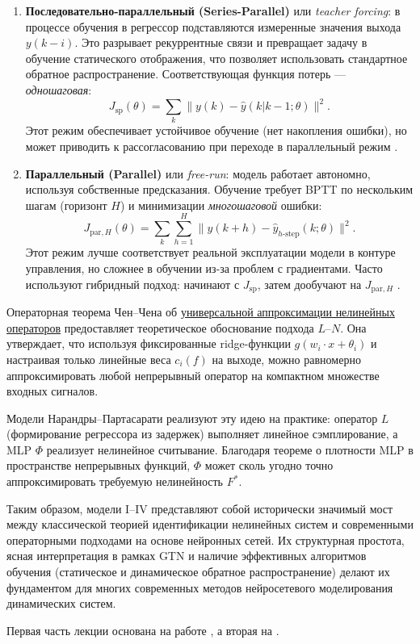 \documentclass[../NDCNNAI_main.tex]{subfiles}
\begin{document}
\begin{enumerate}
    \item \textbf{Последовательно-параллельный (Series-Parallel)} или \emph{teacher forcing}: в процессе обучения в регрессор подставляются измеренные значения выхода \(y(k-i)\). Это разрывает рекуррентные связи и превращает задачу в обучение статического отображения, что позволяет использовать стандартное обратное распространение. Соответствующая функция потерь --- \emph{одношаговая}:
    \[
    J_{\text{sp}}(\theta) = \sum_k \| y(k) - \hat{y}(k|k-1; \theta) \|^2.
    \]
    Этот режим обеспечивает устойчивое обучение (нет накопления ошибки), но может приводить к рассогласованию при переходе в параллельный режим \cite{Narendra1990}.
    
    \item \textbf{Параллельный (Parallel)} или \emph{free-run}: модель работает автономно, используя собственные предсказания. Обучение требует BPTT по нескольким шагам (горизонт \(H\)) и минимизации \emph{многошаговой} ошибки:
    \[
    J_{\text{par},H}(\theta) = \sum_{k} \sum_{h=1}^{H} \| y(k+h) - \hat{y}_{h\text{-step}}(k; \theta) \|^2.
    \]
    Этот режим лучше соответствует реальной эксплуатации модели в контуре управления, но сложнее в обучении из-за проблем с градиентами. Часто используют гибридный подход: начинают с \(J_{\text{sp}}\), затем дообучают на \(J_{\text{par},H}\) \cite{lec04}.
\end{enumerate}

Операторная теорема Чен--Чена об \hyperref[thm:chen_chen_oper]{универсальной аппроксимации нелинейных операторов} предоставляет теоретическое обоснование подхода $L$--$N$. Она утверждает, что используя фиксированные ridge-функции \(g(w_i \cdot x + \theta_i)\) и настраивая только линейные веса \(c_i(f)\) на выходе, можно равномерно аппроксимировать любой непрерывный оператор на компактном множестве входных сигналов.

Модели Нарандры–Партасарати реализуют эту идею на практике: оператор \(L\) (формирование регрессора из задержек) выполняет линейное сэмплирование, а MLP \(\Phi\) реализует нелинейное считывание. Благодаря теореме о плотности MLP в пространстве непрерывных функций, \(\Phi\) может сколь угодно точно аппроксимировать требуемую нелинейность \(F^*\).

Таким образом, модели I–IV представляют собой исторически значимый мост между классической теорией идентификации нелинейных систем и современными операторными подходами на основе нейронных сетей. Их структурная простота, ясная интерпретация в рамках GTN и наличие эффективных алгоритмов обучения (статическое и динамическое обратное распространение) делают их фундаментом для многих современных методов нейросетевого моделирования динамических систем.

Первая часть лекции основана на работе \cite{Mhaskar1997}, а вторая на \cite{Narendra1990}.
\end{document}
